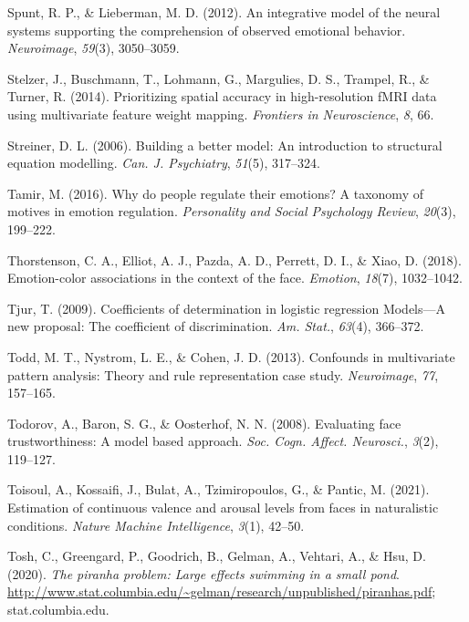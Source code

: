 \documentclass[12pt,american,a4paper,oneside,]{memoir} %
\begin{document}
\leavevmode\hypertarget{ref-spunt2012integrative}{}%
Spunt, R. P., \& Lieberman, M. D. (2012). An integrative model of the neural systems supporting the comprehension of observed emotional behavior. \emph{Neuroimage}, \emph{59}(3), 3050--3059.

\leavevmode\hypertarget{ref-stelzer2014prioritizing}{}%
Stelzer, J., Buschmann, T., Lohmann, G., Margulies, D. S., Trampel, R., \& Turner, R. (2014). Prioritizing spatial accuracy in high-resolution fMRI data using multivariate feature weight mapping. \emph{Frontiers in Neuroscience}, \emph{8}, 66.

\leavevmode\hypertarget{ref-Streiner2006-ze}{}%
Streiner, D. L. (2006). Building a better model: An introduction to structural equation modelling. \emph{Can. J. Psychiatry}, \emph{51}(5), 317--324.

\leavevmode\hypertarget{ref-tamir2016people}{}%
Tamir, M. (2016). Why do people regulate their emotions? A taxonomy of motives in emotion regulation. \emph{Personality and Social Psychology Review}, \emph{20}(3), 199--222.

\leavevmode\hypertarget{ref-Thorstenson2018-io}{}%
Thorstenson, C. A., Elliot, A. J., Pazda, A. D., Perrett, D. I., \& Xiao, D. (2018). Emotion-color associations in the context of the face. \emph{Emotion}, \emph{18}(7), 1032--1042.

\leavevmode\hypertarget{ref-Tjur2009-dp}{}%
Tjur, T. (2009). Coefficients of determination in logistic regression Models---A new proposal: The coefficient of discrimination. \emph{Am. Stat.}, \emph{63}(4), 366--372.

\leavevmode\hypertarget{ref-Todd2013-sd}{}%
Todd, M. T., Nystrom, L. E., \& Cohen, J. D. (2013). Confounds in multivariate pattern analysis: Theory and rule representation case study. \emph{Neuroimage}, \emph{77}, 157--165.

\leavevmode\hypertarget{ref-Todorov2008-eb}{}%
Todorov, A., Baron, S. G., \& Oosterhof, N. N. (2008). Evaluating face trustworthiness: A model based approach. \emph{Soc. Cogn. Affect. Neurosci.}, \emph{3}(2), 119--127.

\leavevmode\hypertarget{ref-Toisoul2021-yc}{}%
Toisoul, A., Kossaifi, J., Bulat, A., Tzimiropoulos, G., \& Pantic, M. (2021). Estimation of continuous valence and arousal levels from faces in naturalistic conditions. \emph{Nature Machine Intelligence}, \emph{3}(1), 42--50.

\leavevmode\hypertarget{ref-Tosh2020-sf}{}%
Tosh, C., Greengard, P., Goodrich, B., Gelman, A., Vehtari, A., \& Hsu, D. (2020). \emph{The piranha problem: Large effects swimming in a small pond}. \url{http://www.stat.columbia.edu/~gelman/research/unpublished/piranhas.pdf}; stat.columbia.edu.
\end{document}
